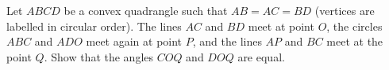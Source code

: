 Let $ABCD$ be a convex quadrangle such that $AB=AC=BD$ (vertices are labelled in circular order). The lines $AC$ and $BD$ meet at point $O$, the circles $ABC$ and $ADO$ meet again at point $P$, and the lines $AP$ and $BC$ meet at the point $Q$. Show that the angles $COQ$ and $DOQ$ are equal.